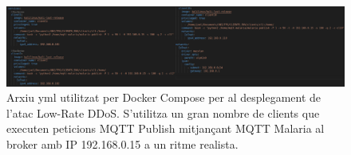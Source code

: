   \begin{figure}[H]
    \centering
    \includegraphics[width=1\textwidth]{img/lrDDoS.png}
    \caption{Arxiu yml utilitzat per Docker Compose per al desplegament de l'atac Low-Rate DDoS. S'utilitza un gran nombre de clients que executen peticions MQTT Publish mitjançant MQTT Malaria al broker amb IP 192.168.0.15 a un ritme realista.}
    \label{fig:LRDoS}
  \end{figure}